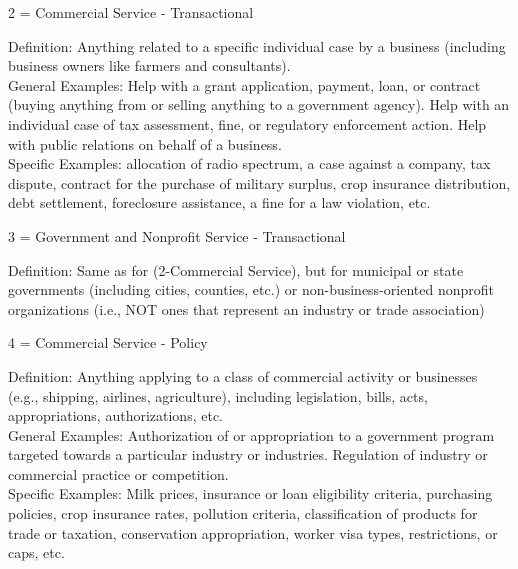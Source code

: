 \documentclass[12pt]{article}
\begin{document}
2 = Commercial Service - Transactional \\

\hfill\begin{minipage}{\dimexpr\textwidth-2cm}
Definition: Anything related to a specific individual case by a business (including business owners like farmers and consultants).\\ 
General Examples: Help with a grant application, payment, loan, or contract (buying anything from or selling anything to a government agency). Help with an individual case of tax assessment, fine, or regulatory enforcement action. Help with public relations on behalf of a business.\\
Specific Examples: allocation of radio spectrum, a case against a company, tax dispute, contract for the purchase of military surplus, crop insurance distribution, debt settlement, foreclosure assistance, a fine for a law violation, etc. \\
\end{minipage}

3 = Government and Nonprofit Service - Transactional\\

\hfill\begin{minipage}{\dimexpr\textwidth-2cm}
Definition: Same as for (2-Commercial Service), but for municipal or state governments (including cities, counties, etc.) or non-business-oriented nonprofit organizations (i.e., NOT ones that represent an industry or trade association) \\
\end{minipage}

4 = Commercial Service - Policy \\

\hfill\begin{minipage}{\dimexpr\textwidth-2cm}
Definition: Anything applying to a class of commercial activity or businesses (e.g., shipping, airlines, agriculture), including legislation, bills, acts, appropriations, authorizations, etc. \\
General Examples: Authorization of or appropriation to a government program targeted towards a particular industry or industries. Regulation of industry or commercial practice or competition.\\
Specific Examples: Milk prices, insurance or loan eligibility criteria, purchasing policies, crop insurance rates, pollution criteria, classification of products for trade or taxation, conservation appropriation, worker visa types, restrictions, or caps, etc.\\
\end{minipage}
 
\end{document}
